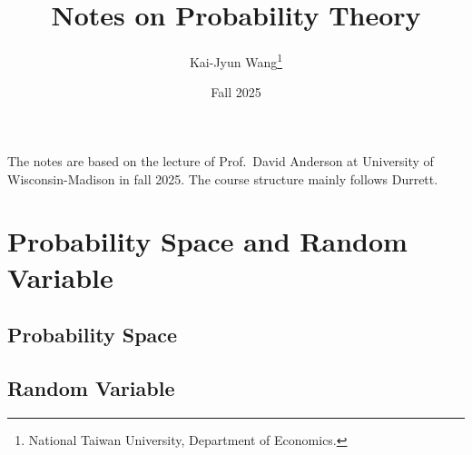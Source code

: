 \documentclass[a4paper, 12pt]{article}
\title{Notes on Probability Theory}
\author{Kai-Jyun Wang\thanks{National Taiwan University, Department of Economics.}}
\date{Fall 2025}
\begin{document}
 
\maketitle

The notes are based on the lecture of Prof.\ David Anderson at University of Wisconsin-Madison 
in fall 2025. The course structure mainly follows Durrett. 

\newpage 
\tableofcontents
\newpage

\section{Probability Space and Random Variable}
\subsection{Probability Space}

\newpage

\subsection{Random Variable}
\end{document}
